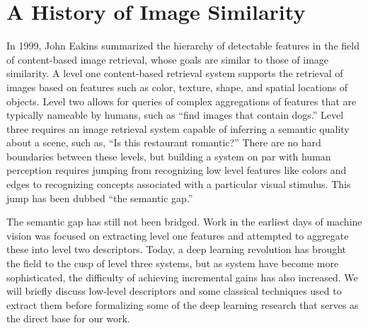 
\section{A History of Image Similarity}

In 1999, John Eakins summarized the hierarchy of detectable features in the field of content-based image retrieval, whose goals are similar to those of image similarity.\cite{eakins1999university} A level one content-based retrieval system supports the retrieval of images based on features such as color, texture, shape, and spatial locations of objects. Level two allows for queries of complex aggregations of features that are typically nameable by humans, such as ``find images that contain dogs.'' Level three requires an image retrieval system capable of inferring a semantic quality about a scene, such as, ``Is this restaurant romantic?'' There are no hard boundaries between these levels, but building a system on par with human perception requires jumping from recognizing low level features like colors and edges to recognizing concepts associated with a particular visual stimulus. This jump has been dubbed ``the semantic gap.'' 

The semantic gap has still not been bridged. Work in the earliest days of machine vision was focused on extracting level one features and attempted to aggregate these into level two descriptors. Today, a deep learning revolution has brought the field to the cusp of level three systems, but as system have become more sophisticated, the difficulty of achieving incremental gains has also increased. We will briefly discuss low-level descriptors and some classical techniques used to extract them before formalizing some of the deep learning research that serves as the direct base for our work.

